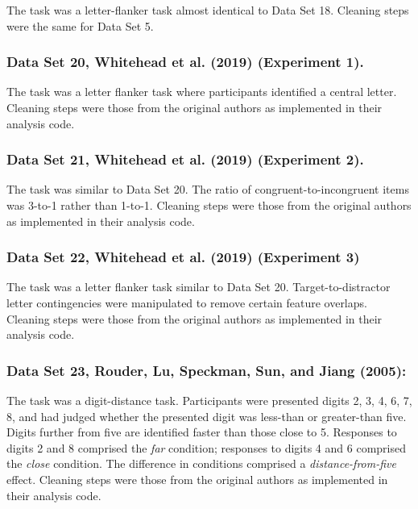 \documentclass[
  ,man]{apa6}
\begin{document}
The task was a letter-flanker task almost identical to Data Set 18. Cleaning steps were the same for Data Set 5.

\hypertarget{data-set-20-whitehead.etal.2019-experiment-1.}{%
\subsubsection{Data Set 20, Whitehead et al. (2019) (Experiment 1).}\label{data-set-20-whitehead.etal.2019-experiment-1.}}

The task was a letter flanker task where participants identified a central letter. Cleaning steps were those from the original authors as implemented in their analysis code.

\hypertarget{data-set-21-whitehead.etal.2019-experiment-2.}{%
\subsubsection{Data Set 21, Whitehead et al. (2019) (Experiment 2).}\label{data-set-21-whitehead.etal.2019-experiment-2.}}

The task was similar to Data Set 20. The ratio of congruent-to-incongruent items was 3-to-1 rather than 1-to-1. Cleaning steps were those from the original authors as implemented in their analysis code.

\hypertarget{data-set-22-whitehead.etal.2019-experiment-3}{%
\subsubsection{Data Set 22, Whitehead et al. (2019) (Experiment 3)}\label{data-set-22-whitehead.etal.2019-experiment-3}}

The task was a letter flanker task similar to Data Set 20. Target-to-distractor letter contingencies were manipulated to remove certain feature overlaps. Cleaning steps were those from the original authors as implemented in their analysis code.

\hypertarget{data-set-23-rouder.etal.2005}{%
\subsubsection{Data Set 23, Rouder, Lu, Speckman, Sun, and Jiang (2005):}\label{data-set-23-rouder.etal.2005}}

The task was a digit-distance task. Participants were presented digits 2, 3, 4, 6, 7, 8, and had judged whether the presented digit was less-than or greater-than five. Digits further from five are identified faster than those close to 5. Responses to digits 2 and 8 comprised the \emph{far} condition; responses to digits 4 and 6 comprised the \emph{close} condition. The difference in conditions comprised a \emph{distance-from-five} effect. Cleaning steps were those from the original authors as implemented in their analysis code.
\end{document}
